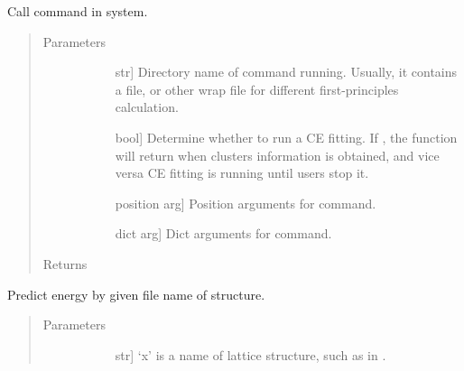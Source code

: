 \documentclass[letterpaper,10pt,english]{sphinxmanual}
\begin{document}
\begin{fulllineitems}
\begin{fulllineitems}
\label{\detokenize{pygace:pygace.ce.CE.mmaps}}
Call  command in system.
\begin{quote}\begin{description}
\item[{Parameters}] \leavevmode\begin{description}
\item[{}] \leavevmode{[}str{]}
Directory name of  command running. Usually, it contains a
 file,  or other wrap file for different
first-principles calculation.

\item[{}] \leavevmode{[}bool{]}
Determine whether to run a CE fitting. If , the function
will return when clusters information is obtained, and vice versa
CE fitting is running until users stop it.

\item[{}] \leavevmode{[}position arg{]}
Position arguments for  command.

\item[{}] \leavevmode{[}dict arg{]}
Dict arguments for  command.

\end{description}

\item[{Returns}] \leavevmode\begin{description}
\item[{}] \leavevmode
\end{description}

\end{description}\end{quote}

\end{fulllineitems}


\begin{fulllineitems}
\label{\detokenize{pygace:pygace.ce.CE.predict}}
Predict energy by given file name of structure.
\begin{quote}\begin{description}
\item[{Parameters}] \leavevmode\begin{description}
\item[{}] \leavevmode{[}str{]}
‘x’ is a name of lattice structure, such as  in .


\end{description}
\end{description}
\end{quote}
\end{fulllineitems}
\end{fulllineitems}
\end{document}
